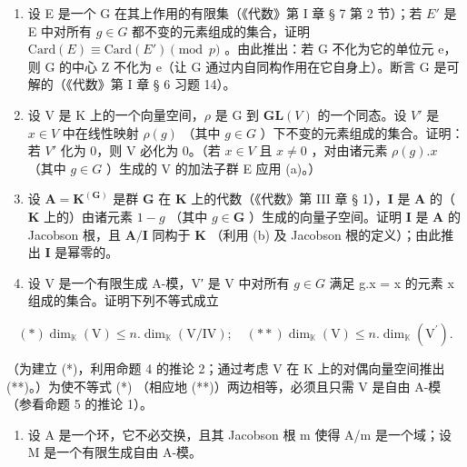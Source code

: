 \begin{enumerate}
\def\labelenumi{(\alph{enumi})}
\item
  设 E 是一个 G 在其上作用的有限集（《代数》第 I 章 § 7 第 2 节）；若 \(E'\) 是 E 中对所有 \(g \in G\) 都不变的元素组成的集合，证明 \(\text{Card}(E) \equiv \text{Card}(E') \pmod{p}\) 。由此推出：若 G 不化为它的单位元 e，则 G 的中心 Z 不化为 e（让 G 通过内自同构作用在它自身上）。断言 G 是可解的（《代数》第 I 章 § 6 习题 14）。
\item
  设 V 是 K 上的一个向量空间，\(\rho\) 是 G 到 \(\mathbf{GL}(V)\) 的一个同态。设 \(V'\) 是 \(x \in V\) 中在线性映射 \(\rho(g)\) （其中 \(g \in G\) ）下不变的元素组成的集合。证明：若 \(V'\) 化为 0，则 V 必化为 0。（若 \(x \in V\) 且 \(x \neq 0\) ，对由诸元素 \(\rho(g).x\) （其中 \(g \in G\) ）生成的 V 的加法子群 E 应用 (a)。）
\item
  设 \(\mathbf{A} = \mathbf{K}^{(\mathbf{G})}\) 是群 \(\mathbf{G}\) 在 \(\mathbf{K}\) 上的代数（《代数》第 III 章 § 1），\(\mathbf{I}\) 是 \(\mathbf{A}\) 的（ \(\mathbf{K}\) 上的）由诸元素 \(1 - g\) （其中 \(g \in \mathbf{G}\) ）生成的向量子空间。证明 \(\mathbf{I}\) 是 \(\mathbf{A}\) 的 Jacobson 根，且 \(\mathbf{A} / \mathbf{I}\) 同构于 \(\mathbf{K}\) （利用 (b) 及 Jacobson 根的定义）；由此推出 \(\mathbf{I}\) 是幂零的。
\item
  设 V 是一个有限生成 A-模，V′ 是 V 中对所有 \(g \in G\) 满足 g.x = x 的元素 x 组成的集合。证明下列不等式成立
\end{enumerate}

\[
(*) \dim_ {\mathbb {K}} (\mathrm{V}) \leqslant n. \dim_ {\mathbb {K}} (\mathrm{V} / \mathrm{IV}); \quad (* *) \dim_ {\mathbb {K}} (\mathrm{V}) \leqslant n. \dim_ {\mathbb {K}} (\mathrm{V} ^ {\prime}).
\]

（为建立 (*)，利用命题 4 的推论 2；通过考虑 V 在 K 上的对偶向量空间推出 (**)。）为使不等式 (*) （相应地 (**)）两边相等，必须且只需 V 是自由 A-模（参看命题 5 的推论 1）。

\begin{enumerate}
\def\labelenumi{\arabic{enumi}.}
\setcounter{enumi}{13}
\tightlist
\item
  设 A 是一个环，它不必交换，且其 Jacobson 根 m 使得 A/m 是一个域；设 M 是一个有限生成自由 A-模。
\end{enumerate}

